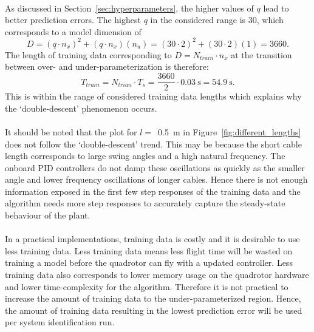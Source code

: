         \paragraph{}
        As discussed in Section~\ref{sec:hyperparameters}, the higher values of $q$ lead to better prediction errors.
        The highest $q$ in the considered range is 30, which corresponds to a model dimension of 
        \begin{equation}
            D = (q \cdot n_x)^2 + (q \cdot n_x)(n_u) = (30 \cdot 2)^2 + (30 \cdot 2)(1) = 3660 .
        \end{equation}
        The length of training data corresponding to $D = N_{train} \cdot n_x$ at the transition between over- and under-parameterization is therefore:
        \begin{equation}
            T_{train} = N_{trian} \cdot T_s = \frac{3660}{2} \cdot \SI{0.03}{\second} = \SI{54.9}{\second} .
        \end{equation}
        This is within the range of considered training data lengths which explains why the `double-descent' phenomenon occurs. 

        \paragraph{}
        It should be noted that the plot for $l =$~\SI{0.5}{\metre} in Figure~\ref{fig:different_lengths}
        does not follow the `double-descent' trend.
        This may be because the short cable length corresponds to large swing angles and a high natural frequency.
        The onboard PID controllers do not damp these oscillations as quickly 
        as the smaller angle and lower frequency oscillations of longer cables.
        Hence there is not enough information exposed in the first few step responses of the training data and
        the algorithm needs more step responses to accurately capture the steady-state behaviour of the plant.

        \paragraph{}
        In a practical implementations, training data is costly and it is desirable to use less training data.
        Less training data means less flight time will be wasted on training a model before the quadrotor can fly with a updated controller.
        Less training data also corresponds to lower memory usage on the quadrotor hardware and lower time-complexity for the algorithm.
        Therefore it is not practical to increase the amount of training data to the under-parameterized region.
        Hence, the amount of training data resulting in the lowest prediction error will be used per system identification run.

